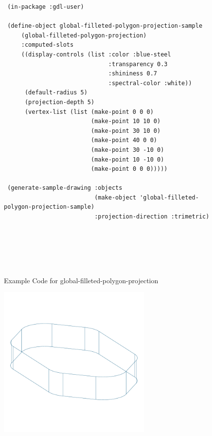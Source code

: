 \documentclass [11pt]{book}
\begin{document}
\begin{itemize}
\begin{figure}
\begin{lrbox}{\boxedverb}
\begin{minipage}{\linewidth}
{\begin{verbatim}
 (in-package :gdl-user)

 (define-object global-filleted-polygon-projection-sample 
     (global-filleted-polygon-projection)
     :computed-slots
     ((display-controls (list :color :blue-steel 
                              :transparency 0.3 
                              :shininess 0.7 
                              :spectral-color :white))
      (default-radius 5)
      (projection-depth 5)
      (vertex-list (list (make-point 0 0 0)
                         (make-point 10 10 0)
                         (make-point 30 10 0)
                         (make-point 40 0 0)
                         (make-point 30 -10 0)
                         (make-point 10 -10 0)
                         (make-point 0 0 0)))))

 (generate-sample-drawing :objects 
                          (make-object 'global-filleted-polygon-projection-sample)
                          :projection-direction :trimetric)






\end{verbatim}}
\end{minipage}
\end{lrbox}
\fbox{\usebox{\boxedverb}}

\caption{Example Code for global-filleted-polygon-projection}

\label{fig:example-code-global-filleted-polygon-projection}

\end{figure}

\begin{figure}
\begin{center}
\includegraphics[width=3in,height=3in]{../images/example-global-filleted-polygon-projection.pdf}
\end{center}


\end{figure}
\end{itemize}
\end{document}

